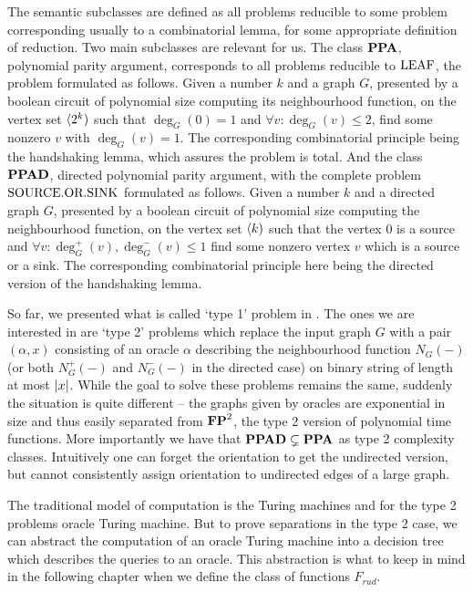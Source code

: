 The semantic subclasses are defined as all problems reducible to some problem corresponding usually to a combinatorial lemma, for some appropriate definition of reduction. Two main subclasses are relevant for us. The class $\textbf{PPA}$, polynomial parity argument, corresponds to all problems reducible to $\text{LEAF}$, the problem formulated as follows. Given a number $k$ and a graph $G$, presented by a boolean circuit of polynomial size computing its neighbourhood function, on the vertex set $\langle 2^k)$ such that $\deg_G(0)=1$ and $\forall v: \deg_G(v)\leq 2$, find some nonzero $v$ with $\deg_G(v)=1$. The corresponding combinatorial principle being the handshaking lemma, which assures the problem is total. And the class $\textbf{PPAD}$, directed polynomial parity argument, with the complete problem $\text{SOURCE.OR.SINK}$ formulated as follows. Given a number $k$ and a directed graph $G$, presented by a boolean circuit of polynomial size computing the neighbourhood function, on the vertex set $\langle k)$ such that the vertex $0$ is a source and $\forall v: \deg_G^+(v),\deg_G^-(v)\leq 1$ find some nonzero vertex $v$ which is a source or a sink. The corresponding combinatorial principle here being the directed version of the handshaking lemma.

So far, we presented what is called `type 1' problem in \cite{beame1995rel}. The ones we are interested in are `type 2' problems which replace the input graph $G$ with a pair $(\alpha,x)$ consisting of an oracle $\alpha$ describing the neighbourhood function $N_G(-)$ (or both $N_G^+(-)$ and $N_G^-(-)$ in the directed case) on binary string of length at most $\left|{x}\right|$. While the goal to solve these problems remains the same, suddenly the situation is quite different -- the graphs given by oracles are exponential in size and thus easily separated from $\textbf{FP}^2$, the type 2 version of polynomial time functions. More importantly we have that $\textbf{PPAD}\subsetneq \textbf{PPA}$ as type 2 complexity classes. Intuitively one can forget the orientation to get the undirected version, but cannot consistently assign orientation to undirected edges of a large graph.

The traditional model of computation is the Turing machines and for the type 2 problems oracle Turing machine. But to prove separations in the type 2 case, we can abstract the computation of an oracle Turing machine into a decision tree which describes the queries to an oracle. This abstraction is what to keep in mind in the following chapter when we define the class of functions $F_{rud}$.
